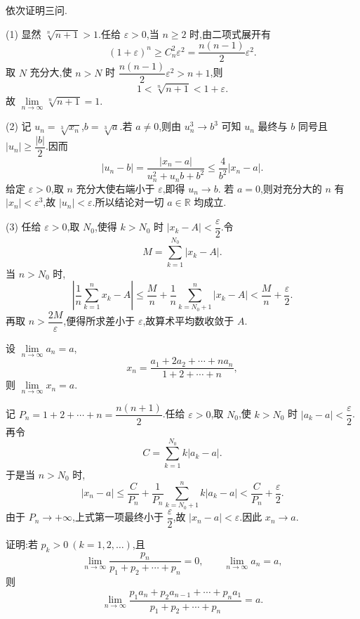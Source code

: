\begin{solution}
  依次证明三问.

  (1) 显然 $\sqrt[n]{n+1}>1$.任给 $\varepsilon>0$,当 $n\geq2$ 时,由二项式展开有
  \[
    (1+\varepsilon)^n
    \geq C_n^2\varepsilon^2
    =\dfrac{n(n-1)}{2}\varepsilon^2.
  \]
  取 $N$ 充分大,使 $n>N$ 时
  $\dfrac{n(n-1)}{2}\varepsilon^2>n+1$,则
  \[
    1<\sqrt[n]{n+1}<1+\varepsilon.
  \]
  故 $\displaystyle \lim\limits_{n\to\infty}\sqrt[n]{n+1}=1$.

  (2) 记 $u_n=\sqrt[3]{x_n}$,$b=\sqrt[3]{a}$.若 $a\neq0$,则由
  $u_n^3\to b^3$ 可知 $u_n$ 最终与 $b$ 同号且 $|u_n|\geq\dfrac{|b|}{2}$.因而
  \[
    |u_n-b|
    =\dfrac{|x_n-a|}{u_n^2+u_nb+b^2}
    \leq \dfrac{4}{b^2}|x_n-a|.
  \]
  给定 $\varepsilon>0$,取 $n$ 充分大使右端小于 $\varepsilon$,即得 $u_n\to b$.
  若 $a=0$,则对充分大的 $n$ 有 $|x_n|<\varepsilon^3$,故
  $|u_n|<\varepsilon$.所以结论对一切 $a\in\mathbb R$ 均成立.

  (3) 任给 $\varepsilon>0$,取 $N_0$,使得 $k>N_0$ 时
  $|x_k-A|<\dfrac{\varepsilon}{2}$.令
  \[
    M=\sum\limits_{k=1}^{N_0}|x_k-A|.
  \]
  当 $n>N_0$ 时,
  \[
    \left|\dfrac{1}{n}\sum\limits_{k=1}^n x_k-A\right|
    \leq \dfrac{M}{n}+\dfrac{1}{n}\sum\limits_{k=N_0+1}^n|x_k-A|
    <\dfrac{M}{n}+\dfrac{\varepsilon}{2}.
  \]
  再取 $n>\dfrac{2M}{\varepsilon}$,便得所求差小于 $\varepsilon$,故算术平均数收敛于 $A$.
\end{solution}

\begin{example}
  设 $\displaystyle \lim\limits_{n\to\infty}a_n=a$,
  \[
    x_n=\dfrac{a_1+2a_2+\cdots+na_n}{1+2+\cdots+n},
  \]
  则 $\displaystyle \lim\limits_{n\to\infty}x_n=a$.
\end{example}
\exampleblank

\begin{solution}
  记 $P_n=1+2+\cdots+n=\dfrac{n(n+1)}{2}$.任给 $\varepsilon>0$,取
  $N_0$,使 $k>N_0$ 时 $|a_k-a|<\dfrac{\varepsilon}{2}$.再令
  \[
    C=\sum\limits_{k=1}^{N_0}k|a_k-a|.
  \]
  于是当 $n>N_0$ 时,
  \[
    |x_n-a|
    \leq \dfrac{C}{P_n}
    +\dfrac{1}{P_n}\sum\limits_{k=N_0+1}^n k|a_k-a|
    <\dfrac{C}{P_n}+\dfrac{\varepsilon}{2}.
  \]
  由于 $P_n\to+\infty$,上式第一项最终小于 $\dfrac{\varepsilon}{2}$,故
  $|x_n-a|<\varepsilon$.因此 $x_n\to a$.
\end{solution}

\begin{example}
  证明:若 $p_k>0\ (k=1,2,\ldots)$,且
  \[
    \lim\limits_{n\to\infty}\dfrac{p_n}{p_1+p_2+\cdots+p_n}=0,
    \qquad
    \lim\limits_{n\to\infty}a_n=a,
  \]
  则
  \[
    \lim\limits_{n\to\infty}
    \dfrac{p_1a_n+p_2a_{n-1}+\cdots+p_na_1}{p_1+p_2+\cdots+p_n}=a.
  \]
\end{example}
\exampleblank

